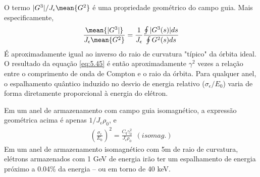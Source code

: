 O termo $|G^3|/J_\epsilon \mean{G^2}$ é uma propriedade geométrico do campo guia. Mais especificamente,
\begin{align}
	\frac{\mean{|G^3|}}{J_\epsilon\mean{G^2}} = \frac{1}{J_\epsilon}\frac{\oint |G^3(s)|ds}{\oint G^2(s)ds}
\end{align}
É aproximadamente igual ao inverso do raio de curvatura "típico" da órbita ideal. O resultado da equação \eqref{eq:5.45} é então aproximadamente $\gamma^2$ vezes a relação entre o comprimento de onda de Compton e o raio da órbita. Para qualquer anel, o espalhamento quântico induzido no desvio de energia relativo ($\sigma_\epsilon/E_0$) varia de forma diretamente proporcional à energia do elétron.

Em um anel de armazenamento com campo guia isomagnético, a expressão geométrica acima é apenas $1/J_\epsilon \rho_0$, e
\begin{align}
	\left(\frac{\sigma_\epsilon}{E_0}\right)^2 = \frac{C_q \gamma_0^2}{J_\epsilon \rho_0}\ \ (isomag.)
\end{align}
Em um anel de armazenamento isomagnético com 5m de raio de curvatura, elétrons armazenados com 1 GeV de energia irão ter um espalhamento de energia próximo a 0.04\% da energia -- ou em torno de 40 keV.
